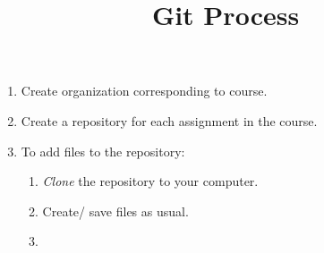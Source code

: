 \documentclass[12pt]{amsart}
\title{Git Process}
\theoremstyle{definition}
\begin{document}
\pagestyle{plain}


\maketitle

\begin{enumerate}
\item Create organization corresponding to course.
\item Create a repository for each assignment in the course.
\item To add files to the repository:
\begin{enumerate}
\item \emph{Clone} the repository to your computer.
\item Create/ save files as usual.
\item 
\end{enumerate}
\end{enumerate}
\end{document}
